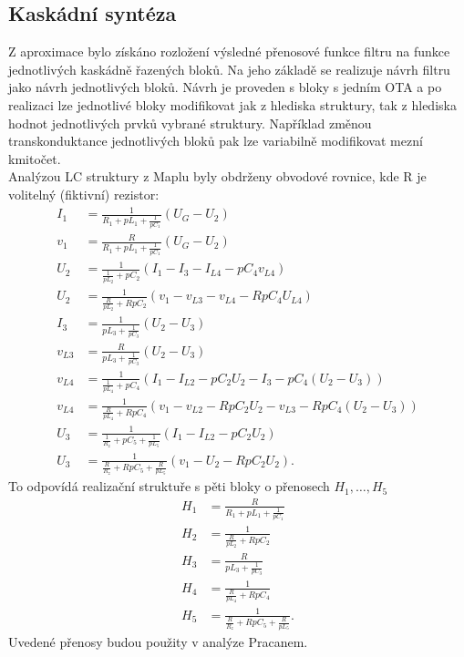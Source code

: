 \subsection{Kaskádní syntéza}\label{s:KASK}
Z aproximace bylo získáno rozložení výsledné přenosové funkce filtru na funkce jednotlivých kaskádně řazených bloků. Na jeho základě se realizuje návrh filtru jako návrh jednotlivých bloků. Návrh je proveden s bloky s jedním OTA a po realizaci lze jednotlivé bloky modifikovat jak z hlediska struktury, tak z hlediska hodnot jednotlivých prvků vybrané struktury. Například změnou transkonduktance jednotlivých bloků pak lze variabilně modifikovat mezní kmitočet.\\
\noindent Analýzou LC struktury z Maplu byly obdrženy obvodové rovnice, kde R je volitelný (fiktivní) rezistor:
\begin{align}
I_1 &= \frac{1}{R_1 + pL_1 + \frac{1}{pC_1}}(U_G - U_2)\\
v_1 & = \frac{R}{R_1 + pL_1 + \frac{1}{pC_1}}(U_G - U_2)\\
U_2 &= \frac{1}{\frac{1}{pL_2} + pC_2}(I_1 - I_{3} - I_{L4} - pC_4 v_{L4})\\
U_2 &= \frac{1}{\frac{R}{pL_2} + RpC_2}(v_1 - v_{L3} - v_{L4} - RpC_4 U_{L4})\\
I_{3} &= \frac{1}{pL_3 + \frac{1}{pC_3}}(U_2 - U_3)\\
v_{L3} &= \frac{R}{pL_3 + \frac{1}{pC_3}}(U_2 - U_3)\\
v_{L4} &= \frac{1}{\frac{1}{pL_4}+pC_4}(I_1 - I_{L2} - pC_2U_2 - I_{3} - pC_4 (U_2 - U_3))\\
v_{L4} &= \frac{1}{\frac{R}{pL_4}+RpC_4}(v_1 - v_{L2} - RpC_2U_2 - v_{L3} - RpC_4 (U_2 - U_3))\\
U_3 &= \frac{1}{\frac{1}{R_z}+pC_5 + \frac{1}{pL_5}}(I_1 - I_{L2} - pC_2U_2)\\
U_3 &= \frac{1}{\frac{R}{R_z}+RpC_5 + \frac{R}{pL_5}}(v_1 - U_2 - RpC_2 U_2).
\end{align}
\noindent To odpovídá realizační struktuře s pěti bloky o přenosech $H_1, \ldots,H_5$
\begin{align}
H_1 & = \frac{R}{R_1 + pL_1 + \frac{1}{pC_1}}\\
H_2 &= \frac{1}{\frac{R}{pL_2} + RpC_2}\\
H_3 &= \frac{R}{pL_3 + \frac{1}{pC_3}}\\
H_4 &= \frac{1}{\frac{R}{pL_4}+RpC_4}\\
H_5 &= \frac{1}{\frac{R}{R_z}+RpC_5 + \frac{R}{pL_5}}.
\end{align}
\noindent Uvedené přenosy budou použity v analýze Pracanem.
